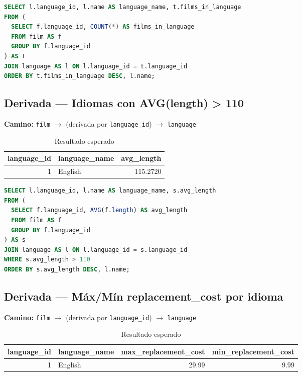 \documentclass[12pt,a4paper]{article}
\begin{document}
\begin{lstlisting}[language=SQL]
SELECT l.language_id, l.name AS language_name, t.films_in_language
FROM (
  SELECT f.language_id, COUNT(*) AS films_in_language
  FROM film AS f
  GROUP BY f.language_id
) AS t
JOIN language AS l ON l.language_id = t.language_id
ORDER BY t.films_in_language DESC, l.name;
\end{lstlisting}

\subsection{Derivada — Idiomas con AVG(length) > 110}
\textbf{Camino:} \texttt{film} $\rightarrow$ (derivada por \texttt{language\_id}) $\rightarrow$ \texttt{language}

\begin{table}[h]
\centering
\caption{Resultado esperado}
\begin{tabular}{@{}r l r@{}}
\toprule
\textbf{language\_id} & \textbf{language\_name} & \textbf{avg\_length} \\
\midrule
1 & English & 115.2720 \\
\bottomrule
\end{tabular}
\end{table}

\begin{lstlisting}[language=SQL]
SELECT l.language_id, l.name AS language_name, s.avg_length
FROM (
  SELECT f.language_id, AVG(f.length) AS avg_length
  FROM film AS f
  GROUP BY f.language_id
) AS s
JOIN language AS l ON l.language_id = s.language_id
WHERE s.avg_length > 110
ORDER BY s.avg_length DESC, l.name;
\end{lstlisting}

\subsection{Derivada — Máx/Mín replacement\_cost por idioma}
\textbf{Camino:} \texttt{film} $\rightarrow$ (derivada por \texttt{language\_id}) $\rightarrow$ \texttt{language}

\begin{table}[h]
\centering
\caption{Resultado esperado}
\begin{tabular}{@{}r l r r@{}}
\toprule
\textbf{language\_id} & \textbf{language\_name} & \textbf{max\_replacement\_cost} & \textbf{min\_replacement\_cost} \\
\midrule
1 & English & 29.99 & 9.99 \\
\bottomrule
\end{tabular}
\end{table}
\end{document}
